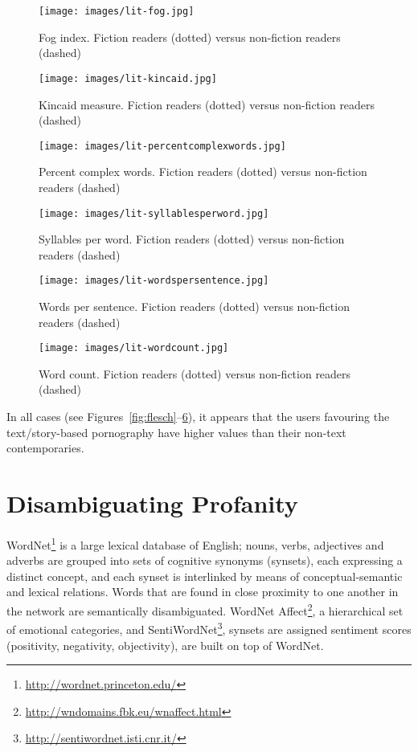 \documentclass[letterpaper]{article}
\begin{document}
\begin{figure}[!hp]
\centering
\texttt{[image: images/lit-fog.jpg]}
\caption{Fog index. Fiction readers (dotted) versus non-fiction readers (dashed)}
\label{fig:fog}
\end{figure}

\begin{figure}[!hp]
\centering
\texttt{[image: images/lit-kincaid.jpg]}
\caption{Kincaid measure. Fiction readers (dotted) versus non-fiction readers (dashed)}
\label{fig:kincaid}
\end{figure}

\begin{figure}[!hp]
\centering
\texttt{[image: images/lit-percentcomplexwords.jpg]}
\caption{Percent complex words. Fiction readers (dotted) versus non-fiction readers (dashed)}
\label{fig:percentcomplex}
\end{figure}

\begin{figure}[!hp]
\centering
\texttt{[image: images/lit-syllablesperword.jpg]}
\caption{Syllables per word. Fiction readers (dotted) versus non-fiction readers (dashed)}
\label{fig:syllables}
\end{figure}

\begin{figure}[tp]
\centering
\texttt{[image: images/lit-wordspersentence.jpg]}
\caption{Words per sentence. Fiction readers (dotted) versus non-fiction readers (dashed)}
\label{fig:wordpersent}
\end{figure}

\begin{figure}[tp]
\centering
\texttt{[image: images/lit-wordcount.jpg]}
\caption{Word count. Fiction readers (dotted) versus non-fiction readers (dashed)}
\label{fig:wordcount}
\end{figure}

In all cases (see Figures~\ref{fig:flesch}--\ref{fig:wordcount}), it
appears that the users favouring the text/story-based pornography have
higher values than their non-text contemporaries.


\section{Disambiguating Profanity}

WordNet\footnote{\url{http://wordnet.princeton.edu/}} is a large
lexical database of English; nouns, verbs, adjectives and adverbs are
grouped into sets of cognitive synonyms (synsets), each expressing a
distinct concept, and each synset is interlinked by means of
conceptual-semantic and lexical relations. Words that are found in
close proximity to one another in the network are semantically
disambiguated. WordNet
Affect\footnote{\url{http://wndomains.fbk.eu/wnaffect.html}}, a
hierarchical set of emotional categories, and
SentiWordNet\footnote{\url{http://sentiwordnet.isti.cnr.it/}}, synsets
are assigned sentiment scores (positivity, negativity, objectivity),
are built on top of WordNet.
\end{document}
